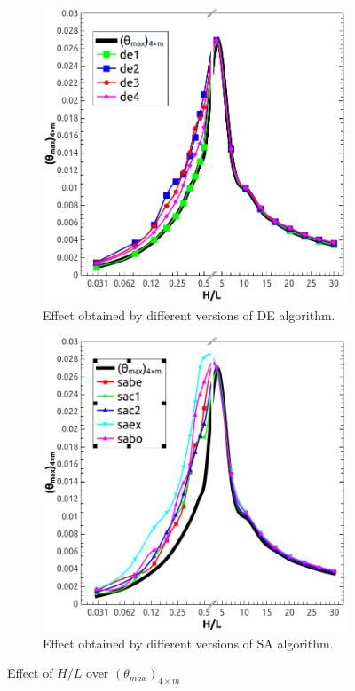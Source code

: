 \documentclass[10pt,fleqn,a4paper,twoside]{article}
\begin{document}
\begin{figure}[h!]
\centering
	\begin{subfigure}{0.52\textwidth}
		\centering
		\includegraphics[width=1\linewidth]{imgs/de/g_hl_tmin_1.png}
		\caption{ {\small Effect obtained by different versions of DE algorithm.}}
		\label{figure03:sub1}
	\end{subfigure}%
	\begin{subfigure}{0.52\textwidth}
		\centering
		\includegraphics[width=1\linewidth]{imgs/sa/g_hl_tmin_1.png}
		\caption{ {\small Effect obtained by different versions of SA algorithm.}}
		\label{figure03:sub2}
	\end{subfigure}%
\caption{Effect of $H/L$ over $({\theta}_{max})_{4\times m}$}
\label{figure03}
\end{figure}
\end{document}

